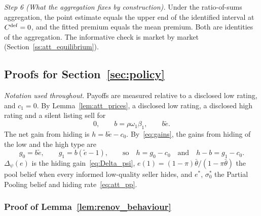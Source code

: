 \emph{Step 6 (What the aggregation fixes by construction).} Under the ratio-of-sums aggregation, the point estimate equals the upper end of the identified interval at $C^{\rm def}=0$, and the fitted premium equals the mean premium. Both are identities of the aggregation. The informative check is market by market (Section~\ref{ss:att_equilibrium}).

\subsection*{Proofs for Section~\ref{sec:policy}}

\noindent\emph{Notation used throughout.} Payoffs are measured relative to a disclosed low rating, and $c_1=0$. By Lemma~\ref{lem:att_prices}, a disclosed low rating, a disclosed high rating and a silent listing sell for
\begin{equation*}
    0,\qquad b=\rho\omega_1\beta_1,\qquad b\tilde e.
\end{equation*}
The net gain from hiding is $h=b\tilde e-c_0$. By~\eqref{eq:gains}, the gains from hiding of the low and the high type are
\begin{equation*}
    g_0=b\tilde e,\qquad g_1=b(\tilde e-1),\qquad\text{so}\quad h=g_0-c_0\quad\text{and}\quad h-b=g_1-c_0.
\end{equation*}
$\Delta_\psi(e)$ is the hiding gain~\eqref{eq:Delta_psi}, $e(1)=(1-\pi)\bar\theta/(1-\pi\bar\theta)$ the pool belief when every informed low-quality seller hides, and $e^*$, $\sigma_0^*$ the Partial Pooling belief and hiding rate~\eqref{eq:att_pp}.

\subsubsection*{Proof of Lemma~\ref{lem:renov_behaviour}}

